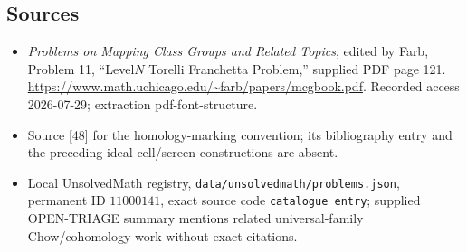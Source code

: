 \documentclass[11pt]{article}
\begin{document}
\subsection{Sources}
\begin{itemize}
\item \emph{Problems on Mapping Class Groups and Related Topics}, edited by Farb, Problem 11, ``Level\(N\) Torelli Franchetta Problem,'' supplied PDF page 121. \url{https://www.math.uchicago.edu/~farb/papers/mcgbook.pdf}. Recorded access 2026-07-29; extraction pdf-font-structure.
\item Source [48] for the homology-marking convention; its bibliography entry and the preceding ideal-cell/screen constructions are absent.
\item Local UnsolvedMath registry, \texttt{data/unsolvedmath/problems.json}, permanent ID \(11000141\), exact source code \texttt{catalogue entry}; supplied OPEN-TRIAGE summary mentions related universal-family Chow/cohomology work without exact citations.
\end{itemize}
\end{document}
